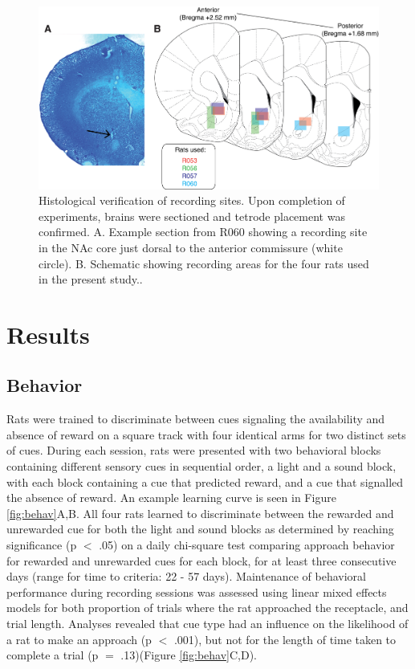 \documentclass[11pt]{article}
\begin{document}
\begin{figure}[h]
\centering
\includegraphics[width=\textwidth]{Fig 3 - Histology.png}
\caption{Histological verification of recording sites. Upon completion of experiments, brains were sectioned and tetrode placement was confirmed. A. Example section from R060 showing a recording site in the NAc core just dorsal to the anterior commissure (white circle). B. Schematic showing recording areas for the four rats used in the present study..}
\label{fig:histo}
\end{figure}

\section*{Results}

\subsection*{Behavior}

Rats were trained to discriminate between cues signaling the availability and absence of reward on a square track with four identical arms for two distinct sets of cues. During each session, rats were presented with two behavioral blocks containing different sensory cues in sequential order, a light and a sound block, with each block containing a cue that predicted reward, and a cue that signalled the absence of reward. An example learning curve is seen in Figure \ref{fig:behav}A,B. All four rats learned to discriminate between the rewarded and unrewarded cue for both the light and sound blocks as determined by reaching significance (p $<$ .05) on a daily chi-square test comparing approach behavior for rewarded and unrewarded cues for each block, for at least three consecutive days (range for time to criteria: 22 - 57 days). Maintenance of behavioral performance during recording sessions was assessed using linear mixed effects models for both proportion of trials where the rat approached the receptacle, and trial length. Analyses revealed that cue type had an influence on the likelihood of a rat to make an approach (p $<$ .001), but not for the length of time taken to complete a trial (p $=$ .13)(Figure \ref{fig:behav}C,D).
\end{document}
